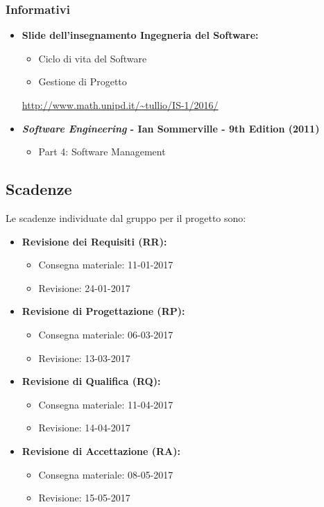 \subsubsection{Informativi}
\begin{itemize}
\item \textbf{Slide dell'insegnamento Ingegneria del Software:}
\begin{itemize}
\item Ciclo di vita del Software
\item Gestione di Progetto
\end{itemize}
\url{http://www.math.unipd.it/~tullio/IS-1/2016/}
\item \textbf{\textit{Software Engineering} - Ian Sommerville - 9th Edition (2011)}
\begin{itemize}
\item Part 4: Software Management
\end{itemize} 
\end{itemize}

\subsection{Scadenze}
Le scadenze individuate dal gruppo \GroupName{} per il progetto \ProjectName{} sono:
\begin{itemize}
	\item \textbf{Revisione dei Requisiti (RR):}
	\begin{itemize}
		\item Consegna materiale: 11-01-2017
		\item Revisione: 24-01-2017
	\end{itemize}
	\item \textbf{Revisione di Progettazione (RP):}
	\begin{itemize}
		\item Consegna materiale: 06-03-2017
		\item Revisione: 13-03-2017
	\end{itemize}
	\item \textbf{Revisione di Qualifica (RQ):}
	\begin{itemize}
		\item Consegna materiale: 11-04-2017
		\item Revisione: 14-04-2017
	\end{itemize}
	\item \textbf{Revisione di Accettazione (RA):}
	\begin{itemize}
		\item Consegna materiale: 08-05-2017
		\item Revisione: 15-05-2017
	\end{itemize}
\end{itemize}

